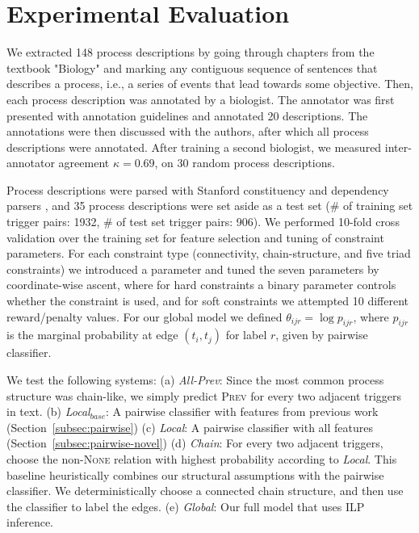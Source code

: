 \section{Experimental Evaluation} \label{subsec:setup}

We extracted 148 process descriptions by going through chapters from the textbook "Biology" and marking any contiguous sequence of sentences that describes a process, i.e., a series of events that lead towards some objective. Then, each process description was annotated by a biologist. The annotator was first presented with annotation guidelines and annotated 20 descriptions. The annotations were then discussed with the authors, after which all process descriptions were annotated. After training a second biologist, we measured inter-annotator agreement $\kappa=0.69$, on 30 random process descriptions. 

Process descriptions were parsed with Stanford constituency and dependency parsers \cite{Klein03,Marneffe06}, and 35 process descriptions were set aside as a test set (\# of training set trigger pairs: 1932, \# of test set trigger pairs: 906). We performed 10-fold cross validation over the training set for feature selection and tuning of constraint parameters. For each constraint type (connectivity, chain-structure, and five triad constraints) we introduced a parameter and tuned the seven parameters by coordinate-wise ascent, where for hard constraints a binary parameter controls whether the constraint is used, and for soft constraints we attempted 10 different reward/penalty values. For our global model we defined $\theta_{ijr}=\log p_{ijr}$, where $p_{ijr}$ is the marginal probability at edge $(t_i,t_j)$ for label $r$, given by pairwise classifier.


We test the following systems: (a) \emph{All-Prev}: Since the most common process structure was chain-like, we simply predict \textsc{Prev} for every two adjacent triggers in text. (b) \emph{Local$_{base}$}: A pairwise classifier with features from previous work (Section~\ref{subsec:pairwise}) (c) \emph{Local}: A pairwise classifier with all features (Section~\ref{subsec:pairwise-novel}) (d) \emph{Chain}: For every two adjacent triggers, choose the non-\textsc{None} relation with highest probability according to \emph{Local}. This baseline heuristically combines our structural assumptions with the pairwise classifier. We deterministically choose a connected chain structure, and then use the classifier to label the edges.  (e) \emph{Global}: Our full model that uses ILP inference.

